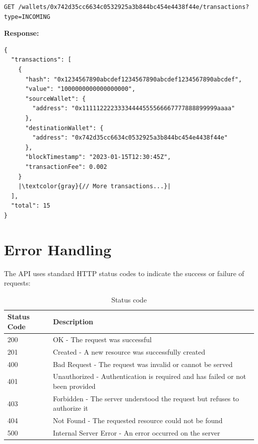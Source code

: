\begin{tcolorbox}[width=\textwidth, boxrule=0.5pt, colback=gray!5, colframe=gray!50]
\begin{verbatim}
GET /wallets/0x742d35cc6634c0532925a3b844bc454e4438f44e/transactions?type=INCOMING
\end{verbatim}
\end{tcolorbox}


\vspace{1em}
\textbf{Response:}

\begin{tcolorbox}[width=\textwidth, boxrule=0.5pt, colback=gray!5, colframe=gray!50]
\begin{verbatim}
{
  "transactions": [
    {
      "hash": "0x1234567890abcdef1234567890abcdef1234567890abcdef",
      "value": "1000000000000000000",
      "sourceWallet": {
        "address": "0x11111222233334444555566667777888899999aaaa"
      },
      "destinationWallet": {
        "address": "0x742d35cc6634c0532925a3b844bc454e4438f44e"
      },
      "blockTimestamp": "2023-01-15T12:30:45Z",
      "transactionFee": 0.002
    }
    |\textcolor{gray}{// More transactions...}|
  ],
  "total": 15
}
\end{verbatim}
\end{tcolorbox}
\section{Error Handling}
The API uses standard HTTP status codes to indicate the success or failure of requests:
\begin{table}[htbp]
\centering
\renewcommand{\arraystretch}{1.3}
\setlength{\tabcolsep}{12pt}
\begin{tabular}{|l|p{}|}
\hline
\textbf{Status Code} & \textbf{Description} \\
\hline
200 & OK - The request was successful \\
\hline
201 & Created - A new resource was successfully created \\
\hline
400 & Bad Request - The request was invalid or cannot be served \\
\hline
401 & Unauthorized - Authentication is required and has failed or not been provided \\
\hline
403 & Forbidden - The server understood the request but refuses to authorize it \\
\hline
404 & Not Found - The requested resource could not be found \\
\hline
500 & Internal Server Error - An error occurred on the server \\
\hline

\end{tabular}
\caption{Status code}
\end{table}

